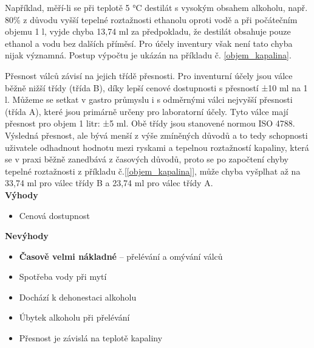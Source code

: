 Například, měří-li se při teplotě 5 °C destilát s vysokým obsahem alkoholu, např. 80\% z důvodu vyšší 
tepelné roztažnosti ethanolu oproti vodě a při počátečním objemu 1 l, vyjde chyba 13,74 ml za předpokladu, že destilát obsahuje pouze ethanol a vodu bez dalších příměsí. Pro účely inventury však není tato chyba nijak významná.
Postup výpočtu je ukázán na příkladu č. \ref{objem_kapalina}.
          
Přesnost válců závisí na jejich třídě přesnosti. Pro inventurní účely jsou válce běžně nižší třídy (třída B), díky lepší cenové dostupnosti s přesností ±10 ml na 1 l. Můžeme se setkat v gastro průmyslu i s odměrnými válci nejvyšší přesnosti (třída A), které jsou primárně určeny pro laboratorní účely. Tyto válce mají přesnost pro objem 1 litr: ±5 ml. Obě třídy jsou stanovené normou ISO 4788. Výsledná přesnost, ale bývá menší z výše zmíněných důvodů a to tedy schopnosti uživatele odhadnout hodnotu mezi ryskami a tepelnou roztažností kapaliny, která se v praxi běžně zanedbává z časových důvodů, proto se po započtení chyby tepelné roztažnosti z příkladu č.[\ref{objem_kapalina}], může chyba vyšplhat až na 33,74 ml pro válec třídy B a 23,74 ml pro válec třídy A.\\



\textbf{Výhody}
\begin{itemize}
    \item Cenová dostupnost\\
\end{itemize}

\textbf{Nevýhody}
\begin{itemize}
    \item \textbf{Časově velmi nákladné} – přelévání a omývání válců
    \item Spotřeba vody při mytí
    \item Dochází k dehonestaci alkoholu
    \item Úbytek alkoholu při přelévání
    \item Přesnost je závislá na teplotě kapaliny
\end{itemize}

